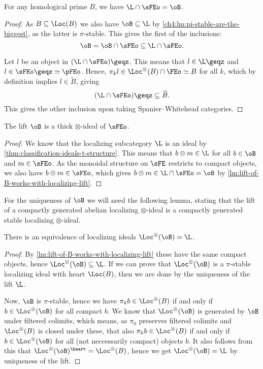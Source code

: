 \begin{lemma}
    \label{lm:lift-of-B-works-with-localizing-lift}
    For any homological prime $B$, we have $\L\cap \sFEo = \oB$. 
\end{lemma}
\begin{proof}
    As $B \subseteq \Loc(B)$ we also have $\oB \subseteq \L$ by \cref{ch4:lm:pi-stable-are-the-biggest}, as the latter is $\pi$-stable. This gives the first of the inclusions:
    \[\oB = \oB \cap \sFEo\subseteq \L \cap \sFEo.\]
    
    Let $l$ be an object in $(\L\cap \sFEo)\geqz$. This means that $l\in \L\geqz$ and $l \in \sFEo\geqz \simeq \pFEo$. Hence, $\pi_k l \in \Loc^\otimes(B)\cap \FEo \simeq B$ for all $k$, which by definition implies $l \in \widetilde{B}$, giving 
    \[(\L\cap \sFEo)\geqz \subseteq \widetilde{B}.\]
    This gives the other inclusion upon taking Spanier--Whitehead categories. 
\end{proof}

\begin{corollary}
    \label{cor:stable-lift-is-ideal}
    The lift $\oB$ is a thick $\otimes$-ideal of $\sFEo$.
\end{corollary}
\begin{proof}
    We know that the localizing subcategory $\L$ is an ideal by \cref{thm:classification-ideals-t-structure}. This means that $b \otimes m \in \L$ for all $b\in \oB$ and $m \in \sFEo$. As the monoidal structure on $\sFE$ restricts to compact objects, we also have $b\otimes m \in \sFEo$, which gives $b\otimes m \in \L \cap \sFEo = \oB$ by \cref{lm:lift-of-B-works-with-localizing-lift}. 
\end{proof}

For the uniqueness of $\oB$ we will need the following lemma, stating that the lift of a compactly generated abelian localizing $\otimes$-ideal is a compactly generated stable localizing $\otimes$-ideal. 

\begin{lemma}
    \label{lm:loc-of-lift-is-localizing-lift}
    There is an equivalence of localizing ideals $\Loc^\otimes(\oB) = \L$. 
\end{lemma}
\begin{proof}
    By \cref{lm:lift-of-B-works-with-localizing-lift} these have the same compact objects, hence $\Loc^\otimes(\oB)\subseteq \L$. If we can prove that $\Loc^\otimes(\oB)$ is a $\pi$-stable localizing ideal with heart $\Loc(B)$, then we are done by the uniqueness of the lift $\L$. 

    Now, $\oB$ is $\pi$-stable, hence we have $\pi_k b \in \Loc^\otimes(B)$ if and only if $b\in \Loc^\otimes(\oB)$ for all compact $b$. We know that $\Loc^\otimes(\oB)$ is generated by $\oB$ under filtered colimits, which means, as $\pi_0$ preserves filtered colimits and $\Loc^\otimes(B)$ is closed under these, that also $\pi_k b\in \Loc^\otimes(B)$ if and only if $b\in \Loc^\otimes(\oB)$ for all (not neccessarily compact) objects $b$. It also follows from this that $\Loc^\otimes(\oB)^\heart = \Loc^\otimes(B)$, hence we get $\Loc^\otimes(\oB) = \L$ by uniqueness of the lift. 
\end{proof}

